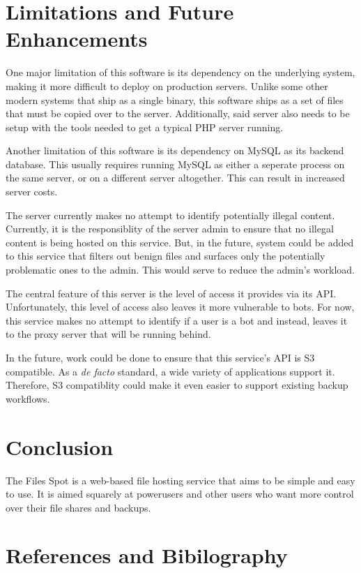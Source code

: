 \documentclass[12pt,a4paper]{report}
\begin{document}
\chapter{Limitations and Future Enhancements}\label{cha:limitations_and_future_enhancements}
One major limitation of this software is its dependency on the underlying system, making it more difficult to deploy on production servers.
Unlike some other modern systems that ship as a single binary, this software ships as a set of files that must be copied over to the server.
Additionally, said server also needs to be setup with the tools needed to get a typical PHP server running.

Another limitation of this software is its dependency on MySQL as its backend database.
This usually requires running MySQL as either a seperate process on the same server, or on a different server altogether.
This can result in increased server costs.

The server currently makes no attempt to identify potentially illegal content.
Currently, it is the responsiblity of the server admin to ensure that no illegal content is being hosted on this service.
But, in the future, system could be added to this service that filters out benign files and surfaces only the potentially problematic ones to the admin.
This would serve to reduce the admin's workload.

The central feature of this server is the level of access it provides via its API.
Unfortunately, this level of access also leaves it more vulnerable to bots.
For now, this service makes no attempt to identify if a user is a bot and instead, leaves it to the proxy server that will be running behind.

In the future, work could be done to ensure that this service's API is S3 compatible.
As a \textit{de facto} standard, a wide variety of applications support it.
Therefore, S3 compatiblity could make it even easier to support existing backup workflows.
\newpage
\chapter{Conclusion}\label{cha:conclusion}
The Files Spot is a web-based file hosting service that aims to be simple and easy to use.
It is aimed squarely at powerusers and other users who want more control over their file shares and backups.
\newpage
\chapter{References and Bibilography}\label{cha:references_and_bibilography}
\end{document}
